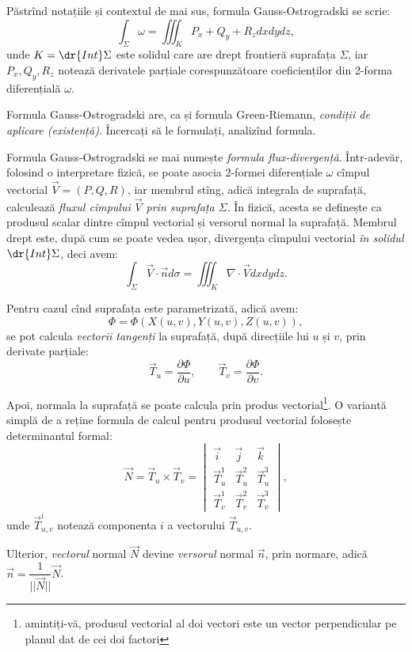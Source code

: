 Păstrînd notațiile și contextul de mai sus, formula Gauss-Ostrogradski se
scrie:
\[
  \int_\Sigma \omega = \iiint_K P_x + Q_y + R_z dxdydz,
\]
unde $ K = \dr{Int}\Sigma $ este solidul care are drept frontieră suprafața
$ \Sigma $, iar $ P_x, Q_y, R_z $ notează derivatele parțiale corespunzătoare
coeficienților din 2-forma diferențială $ \omega $.

\begin{remark}\label{rk:go-exist}
  Formula Gauss-Ostrogradski are, ca și formula Green-Riemann, \emph{condiții %
  de aplicare (existență)}. Încercați să le formulați, analizînd formula.
\end{remark}

Formula Gauss-Ostrogradski se mai numește \emph{formula flux-divergență}.
Într-adevăr, folosind o interpretare fizică, se poate asocia 2-formei diferențiale
$ \omega $ cîmpul vectorial $ \vec{V} = (P, Q, R) $, iar membrul stîng, adică
integrala de suprafață, calculează \emph{fluxul cîmpului $ \vec{V}$ prin suprafața
  $ \Sigma $}. În fizică, acesta se definește ca produsul scalar dintre cîmpul
vectorial și versorul normal la suprafață. Membrul drept este, după cum se poate
vedea ușor, divergența cîmpului vectorial \emph{în solidul $ \dr{Int}\Sigma $},
deci avem:
\[
  \int_\Sigma \vec{V} \cdot \vec{n} d\sigma = \iiint_K \nabla \cdot \vec{V} dxdydz.
\]

Pentru cazul cînd suprafața este parametrizată, adică avem:
\[
  \Phi = \Phi(X(u, v), Y(u, v), Z(u, v)),
\]
se pot calcula \emph{vectorii tangenți} la suprafață, după direcțiile
lui $ u $ și $ v $, prin derivate parțiale:
\[
  \vec{T}_u = \dfrac{\partial \Phi}{\partial u}, \qquad %
  \vec{T}_v = \dfrac{\partial \Phi}{\partial v}.
\]

Apoi, normala la suprafață se poate calcula prin produs vectorial\footnote{
  amintiți-vă, produsul vectorial al doi vectori este un vector perpendicular
  pe planul dat de cei doi factori}. O variantă simplă de a reține formula
de calcul pentru produsul vectorial folosește determinantul formal:
\[
  \vec{N} = \vec{T}_u \times \vec{T}_v = %
  \begin{vmatrix}
    \vec{i} & \vec{j} & \vec{k} \\
    \vec{T}_u^1 & \vec{T}_u^2 & \vec{T}_u^3 \\
    \vec{T}_v^1 & \vec{T}_v^2 & \vec{T}_v^3
  \end{vmatrix},
\]
unde $ \vec{T}_{u,v}^i $ notează componenta $ i $ a vectorului $ \vec{T}_{u, v} $.

Ulterior, \emph{vectorul} normal $ \vec{N} $ devine \emph{versorul} normal $ \vec{n} $,
prin normare, adică $ \vec{n} = \dfrac{1}{||\vec{N}||} \vec{N} $.

